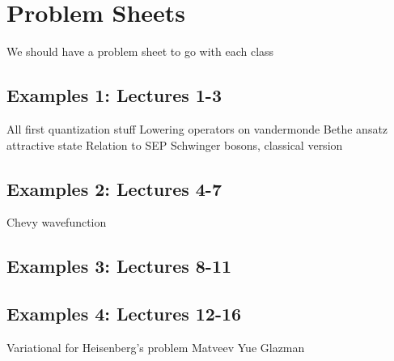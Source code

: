 \section{Problem Sheets}


We should have a problem sheet to go with each class

\subsection{Examples 1: Lectures 1-3}

All first quantization stuff
Lowering operators on vandermonde
Bethe ansatz attractive state
Relation to SEP
Schwinger bosons, classical version

\subsection{Examples 2: Lectures 4-7}

Chevy wavefunction

\subsection{Examples 3: Lectures 8-11}

\subsection{Examples 4: Lectures 12-16}


Variational for Heisenberg's problem
Matveev Yue Glazman
